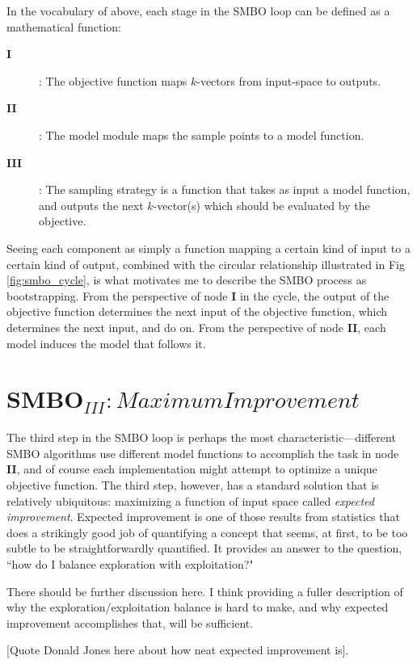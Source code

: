 In the vocabulary of above, each stage in the SMBO loop can be defined as a mathematical function:
\begin{description}
	\item[\textbf{I}]: The objective function maps $k$-vectors from input-space to outputs.
	\item[\textbf{II}]: The model module maps the sample points to a model function.
	\item[\textbf{III}]: The sampling strategy is a function that takes as input a model function, and outputs the next $k$-vector(s) which should be evaluated by the objective.
\end{description}

Seeing each component as simply a function mapping a certain kind of input to a certain kind of output, combined with the circular relationship illustrated in Fig \ref{fig:smbo_cycle}, is what motivates me to describe the SMBO process as bootstrapping. From the perspective of node \textbf{I} in the cycle, the output of the objective function determines the next input of the objective function, which determines the next input, and do on. From the perspective of node \textbf{II}, each model induces the model that follows it.

\section{SMBO$_{III}: Maximum Improvement$}

The third step in the SMBO loop is perhaps the most characteristic---different SMBO algorithms use different model functions to accomplish the task in node \textbf{II}, and of course each implementation might attempt to optimize a unique objective function. The third step, however, has a standard solution that is relatively ubiquitous: maximizing a function of input space called \emph{expected improvement}. Expected improvement is one of those results from statistics that does a strikingly good job of quantifying a concept that seems, at first, to be too subtle to be straightforwardly quantified. It provides an answer to the question, ``how do I balance exploration with exploitation?"

There should be further discussion here. I think providing a fuller description of why the exploration/exploitation balance is hard to make, and why expected improvement accomplishes that, will be sufficient.

[Quote Donald Jones here about how neat expected improvement is].

